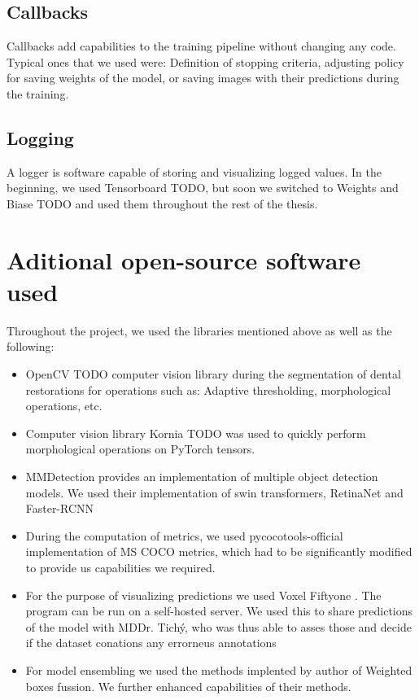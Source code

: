 \subsection{Callbacks}
Callbacks add capabilities to the training pipeline without changing any code. Typical ones that we used were: Definition of stopping criteria, adjusting policy for saving weights of the model, or saving images with their predictions during the training.

\subsection{Logging}
A logger is software capable of storing and visualizing logged values. In the beginning, we used Tensorboard TODO, but soon we switched to Weights and Biase TODO and used them throughout the rest of the thesis.

\section{Aditional open-source software used}
Throughout the project, we used the libraries mentioned above as well as the following:
\begin{itemize}
    \item OpenCV TODO  computer vision library during the segmentation of dental restorations for operations such as: Adaptive thresholding, morphological operations, etc.
    \item Computer vision library Kornia TODO was used to quickly perform morphological operations on PyTorch tensors.
    \item MMDetection  provides an implementation of multiple object detection models. We used their implementation of swin transformers, RetinaNet and Faster-RCNN
    \item During the computation of metrics, we used pycocotools-official implementation of MS COCO metrics, which had to be significantly modified to provide us capabilities we required.
    \item For the purpose of visualizing predictions we used Voxel Fiftyone \cite{moore2020fiftyone}. The program can be run on a self-hosted server. We used this to share predictions of the model with MDDr. Tichý, who was thus able to asses those and decide if the dataset conations any errorneus annotations
    \item For model ensembling we used the methods implented by author of Weighted boxes fussion. We further enhanced capabilities of their methods.
\end{itemize}